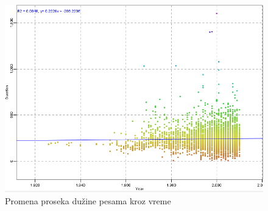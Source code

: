 \begin{figure}[H]
    \centering
    \includegraphics[scale=0.6]{resources/year-duration.PNG}
    \caption{Promena proseka du\v{z}ine pesama kroz vreme}
    \label{fig:YearDurationAvg}
\end{figure}
